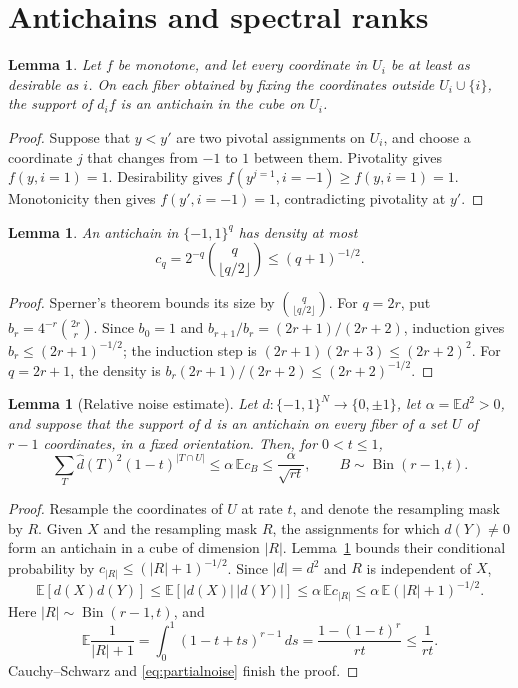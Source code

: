 \documentclass[11pt]{amsart}
\newtheorem{lemma}[theorem]{Lemma}
\theoremstyle{definition}
\theoremstyle{remark}
\newcommand{\bits}{\{-1,1\}}
\newcommand{\E}{\mathbb E}
\newcommand{\wh}[1]{\widehat{#1}}
\begin{document}
\section{Antichains and spectral ranks}\label{sec:rank}

\begin{lemma}\label{lem:pivotal-antichain}
Let $f$ be monotone, and let every coordinate in $U_i$ be at least as desirable as $i$.
On each fiber obtained by fixing the coordinates outside $U_i\cup\{i\}$, the support of $d_i f$ is an antichain in the cube on $U_i$.
\end{lemma}
\begin{proof}
Suppose that $y<y'$ are two pivotal assignments on $U_i$, and choose a coordinate $j$ that changes from $-1$ to $1$ between them.
Pivotality gives $f(y,i=1)=1$.
Desirability gives $f(y^{j=1},i=-1)\ge f(y,i=1)=1$.
Monotonicity then gives $f(y',i=-1)=1$, contradicting pivotality at $y'$.
\end{proof}

\begin{lemma}\label{lem:antichain-density}
An antichain in $\bits^q$ has density at most
\[
 c_q=2^{-q}\binom q{\lfloor q/2\rfloor}\le(q+1)^{-1/2}.
\]
\end{lemma}
\begin{proof}
Sperner's theorem \cite{Sperner28} bounds its size by $\binom q{\lfloor q/2\rfloor}$.
For $q=2r$, put $b_r=4^{-r}\binom{2r}r$.
Since $b_0=1$ and $b_{r+1}/b_r=(2r+1)/(2r+2)$, induction gives
$b_r\le(2r+1)^{-1/2}$; the induction step is
$(2r+1)(2r+3)\le(2r+2)^2$.
For $q=2r+1$, the density is $b_r(2r+1)/(2r+2)\le(2r+2)^{-1/2}$.
\end{proof}

\begin{lemma}[Relative noise estimate]\label{lem:antichain-noise}
Let $d:\bits^N\to\{0,\pm1\}$, let $\alpha=\E d^2>0$, and suppose that the support of $d$ is an antichain on every fiber of a set $U$ of $r-1$ coordinates, in a fixed orientation.
Then, for $0<t\le1$,
\begin{equation}\label{eq:relative-noise}
 \sum_T\wh d(T)^2(1-t)^{|T\cap U|}
 \le\alpha\,\E c_B\le\frac{\alpha}{\sqrt{rt}},
 \qquad B\sim\operatorname{Bin}(r-1,t).
\end{equation}
\end{lemma}
\begin{proof}
Resample the coordinates of $U$ at rate $t$, and denote the resampling mask by $R$.
Given $X$ and the resampling mask $R$, the assignments for which $d(Y)\ne0$ form an antichain in a cube of dimension $|R|$.
Lemma~\ref{lem:antichain-density} bounds their conditional probability by
$c_{|R|}\le(|R|+1)^{-1/2}$.
Since $|d|=d^2$ and $R$ is independent of $X$,
\[
 \E[d(X)d(Y)]
 \le\E[|d(X)|\,|d(Y)|]
 \le\alpha\,\E c_{|R|}
 \le\alpha\,\E(|R|+1)^{-1/2}.
\]
Here $|R|\sim\operatorname{Bin}(r-1,t)$, and
\[
 \E\frac1{|R|+1}
 =\int_0^1(1-t+ts)^{r-1}\,ds
 =\frac{1-(1-t)^r}{rt}\le\frac1{rt}.
\]
Cauchy--Schwarz and \eqref{eq:partialnoise} finish the proof.
\end{proof}
\end{document}
